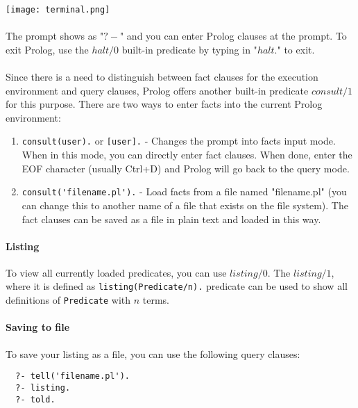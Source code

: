 \documentclass{article}
\begin{document}
\begin{multicols}{2}
  \noindent \texttt{[image: terminal.png]}
  
  \paragraph{} The prompt shows as "$?-$" and you can enter Prolog clauses at the prompt. To exit Prolog, use the $halt/0$ built-in predicate by typing in "$halt.$" to exit.
  
  \paragraph{} Since there is a need to distinguish between fact clauses for the execution environment and query clauses, Prolog offers another built-in predicate $consult/1$ for this purpose. There are two ways to enter facts into the current Prolog environment:
  
  \begin{enumerate}
  \item \lstinline{consult(user).} or \lstinline{[user].} - Changes the prompt into facts input mode. When in this mode, you can directly enter fact clauses. When done, enter the EOF character (usually Ctrl+D) and Prolog will go back to the query mode.
  \item \lstinline{consult('filename.pl').} - Load facts from a file named "filename.pl" (you can change this to another name of a file that exists on the file system). The fact clauses can be saved as a file in plain text and loaded in this way.
  \end{enumerate}
  
  \paragraph{Listing} To view all currently loaded predicates, you can use $listing/0$. The $listing/1$, where it is defined as \lstinline{listing(Predicate/n).} predicate can be used to show all definitions of \lstinline{Predicate} with $n$ terms.
  
  \paragraph{Saving to file} To save your listing as a file, you can use the following query clauses:
  
  \begin{lstlisting}
  ?- tell('filename.pl').
  ?- listing.
  ?- told.
  \end{lstlisting}
  

\end{multicols}
\end{document}
